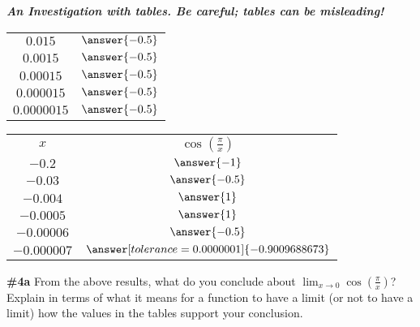 \documentclass[handout,nooutcomes]{ximera}
\begin{document}
\begin{problem}{\textbf{\textit{An Investigation with tables. Be careful; tables can be misleading! }}}
\begin{tabular}{|c|c|}
		$0.015$ & $\answer{-0.5}$\\
		
		$0.0015$ & $\answer{-0.5}$\\
		
		$0.00015$ & $\answer{-0.5}$\\
		
		$0.000015$ & $\answer{-0.5}$ \\
		
		$0.0000015$ & $\answer{-0.5}$ \\

		
\end{tabular}

\bigskip

\begin{tabular}{|c|c|}

\hline
		$x$ & $\cos\left(\frac{\pi}{x}\right)$\\
		
        $-0.2$ & $\answer{-1}$\\
		
		$-0.03$ & $\answer{-0.5}$\\
		
		$-0.004$ & $\answer{1}$\\
		
		$-0.0005$ & $\answer{1}$\\
		
		$-0.00006$ & $\answer{-0.5}$ \\
		
		$-0.000007$ & $\answer[tolerance=0.0000001]{-0.9009688673}$ \\

		
\end{tabular}



    \begin{problem}{\textbf{\#4a}}
    From the above results, what do you conclude about $\displaystyle\lim_{x\rightarrow 0}\cos\left(\frac{\pi}{x}\right)$? Explain in terms of what it means for a function to have a limit (or not to have a limit) how the values in the tables support your conclusion.
    \end{problem}
    
\end{problem}
\end{document}
